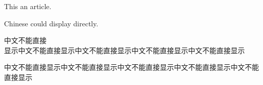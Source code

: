 \documentclass[]{article}
\begin{document}
	This an article.
 
Chinese could display directly.

中文不能直接\\

显示中文不能直接显示中文不能直接显示中文不能直接显示中文不能直接显示




中文不能直接显示中文不能直接显示中文不能直接显示中文不能直接显示中文不能直接显示
\end{document}
